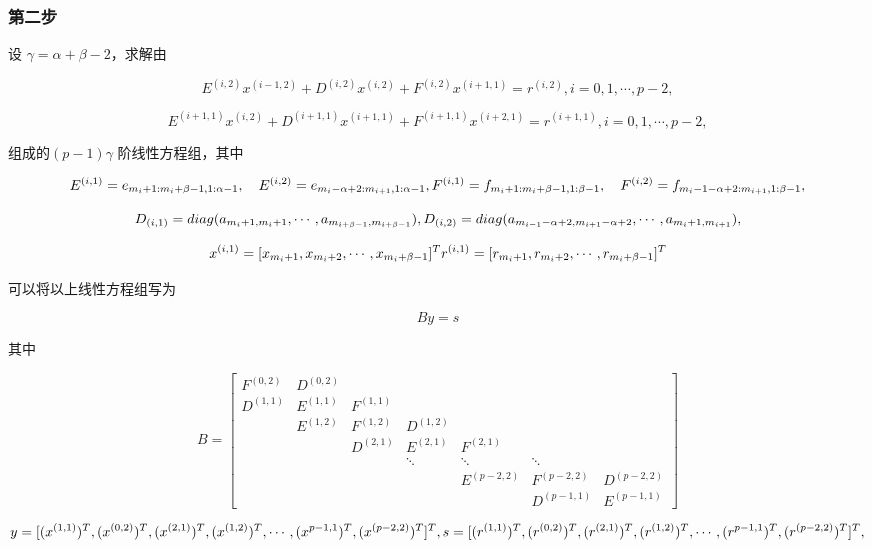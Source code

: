 \documentclass[
]{article}
\begin{document}
\hypertarget{header-n27}{%
\subsubsection{第二步}\label{header-n27}}

设 \(\gamma = \alpha+\beta-2\)，求解由

\[E^{(i,2)}x^{(i-1,2)}+D^{(i,2)}x^{(i,2)}+F^{(i,2)}x^{(i+1,1)}=r^{(i,2)},i=0,1,\cdots,p-2,\]

\[E^{(i+1,1)}x^{(i,2)}+D^{(i+1,1)}x^{(i+1,1)}+F^{(i+1,1)}x^{(i+2,1)}=r^{(i+1,1)},i=0,1,\cdots,p-2,\]

组成的\((p-1)\gamma\) 阶线性方程组，其中

\[E^{(i,1)}=e_{m_i+1:m_i+\beta-1,1:\alpha-1}, \quad E^{(i,2)}=e_{m_i-\alpha+2:m_{i+1},1:\alpha-1}, \\
F^{(i,1)}=f_{m_i+1:m_i+\beta-1,1:\beta-1}, \quad F^{(i,2)}=f_{m_i-1-\alpha+2:m_{i+1},1:\beta-1},\]

\[D_{(i,1)}=diag(a_{m_i+1,m_i+1},\cdots,a_{m_{i+\beta-1},m_{i+\beta-1}}),
\\
D_{(i,2)}=diag(a_{m_{i-1}-\alpha+2,m_{i+1}-\alpha+2},\cdots,a_{m_i+1,m_{i+1}}),\]

\[x^{(i,1)}=[x_{m_i+1},x_{m_i+2},\cdots,x_{m_i+\beta-1}]^T \\
r^{(i,1)}=[r_{m_i+1},r_{m_i+2},\cdots,r_{m_i+\beta-1}]^T\]

可以将以上线性方程组写为

\[By=s\]

其中

\[B=
\begin{bmatrix}
F^{(0,2)} & D^{(0,2)} \\
D^{(1,1)} & E^{(1,1)} & F^{(1,1)} \\
                  & E^{(1,2)} & F^{(1,2)} & D^{(1,2)} \\
                  &               & D^{(2,1)} & E^{(2,1)} & F^{(2,1)} \\
                  &                       &                       &     \ddots    & \ddots      & \ddots \\
                  &                       &               &               & E^{(p-2,2)} & F^{(p-2,2)} & D^{(p-2,2)} \\
                  &                       &               &               &                     & D^{(p-1,1)} & E^{(p-1,1)}
\end{bmatrix}\]

\[y=[ (x^{(1,1)})^T , (x^{(0,2)})^T , (x^{(2,1)})^T , (x^{(1,2)})^T,\cdots,(x^{p-1,1})^T,(x^{(p-2,2)})^T]^T, \\
s=[ (r^{(1,1)})^T , (r^{(0,2)})^T , (r^{(2,1)})^T , (r^{(1,2)})^T,\cdots,(r^{p-1,1})^T,(r^{(p-2,2)})^T]^T,\]
\end{document}
